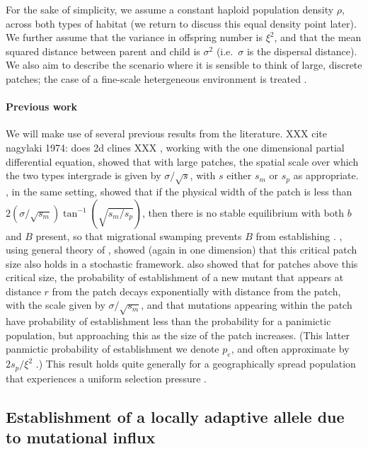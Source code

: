 \documentclass{article}
\begin{document}
For the sake of simplicity, we assume a constant haploid population density $\rho$, 
across both types of habitat (we return to discuss this equal density point later). 
We further assume that the variance in offspring number is $\xi^2$, 
and that the mean squared distance between parent and child is $\sigma^2$
(i.e.\ $\sigma$ is the dispersal distance).
We also aim to describe the scenario where it is sensible to think of large, discrete patches;
the case of a fine-scale hetergeneous environment is treated \citep{elsewhere}.

\paragraph{Previous work} 
We will make use of several previous results from the literature. 
XXX cite nagylaki 1974: does 2d clines XXX
\citet{haldane1948theory}, working with the one dimensional partial differential equation,
showed that with large patches, the spatial scale over which the two types intergrade is given by $\sigma/\sqrt{s}$,
with $s$ either $s_m$ or $s_p$ as appropriate.
\citet{slatkin1973geneflow}, in the same setting,
showed that if the physical width of the patch is less than $2 (\sigma/\sqrt{s_m}) \tan^{-1} (\sqrt{s_m/s_p})$, 
then there is no stable equilibrium with both $b$ and $B$ present,
so that migrational swamping prevents $B$ from establishing \citep[see also][ for a review]{lenormand2002limits}.
\citet{barton1987establishment}, using general theory of \citet{pollak1966survival}, showed (again in one dimension) 
that this critical patch size also holds in a stochastic framework.
\citet{barton1987establishment} also showed that
for patches above this critical size,
the probability of establishment of a new mutant that appears at distance $r$ from the patch
decays exponentially with distance from the patch, with the scale given by $\sigma/\sqrt{s_m}$,
and that mutations appearing within the patch have probability of establishment
less than the probability for a panimictic population,
but approaching this as the size of the patch increases.
(This latter panmictic probability of establishment we denote $p_e$,
and often approximate by $2 s_p / \xi^2$ \citep{haldane,fisher}.)
This result holds quite generally for a geographically spread population that experiences a uniform selection
pressure \citep{maruyama1970fixation,cherry2003diffusion}. 



\subsection{Establishment of a locally adaptive allele due to mutational influx}
\label{ss:patchymutation}
\end{document}

